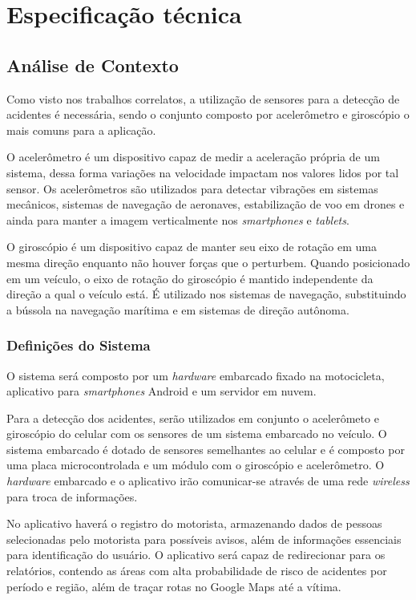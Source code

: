 \chapter{Especificação técnica} \label{cap:metodologia}


\section{Análise de Contexto}

Como visto nos trabalhos correlatos, a utilização de sensores para a detecção de acidentes é necessária, sendo o conjunto composto por acelerômetro e giroscópio o mais comuns para a aplicação. 

O acelerômetro é um dispositivo capaz de medir a aceleração própria de um sistema, dessa forma variações na velocidade impactam nos valores lidos por tal sensor. Os acelerômetros são utilizados para detectar vibrações em sistemas mecânicos, sistemas de navegação de aeronaves, estabilização de voo em drones e ainda para manter a imagem verticalmente nos \textit{smartphones} e \textit{tablets}.

O giroscópio é um dispositivo capaz de manter seu eixo de rotação em uma mesma direção enquanto não houver forças que o perturbem. Quando posicionado em um veículo, o eixo de rotação do giroscópio é mantido independente da direção a qual o veículo está. É utilizado nos sistemas de navegação, substituindo a bússola na navegação marítima e em sistemas de direção autônoma.


\subsection{\textbf{Definições do Sistema}}

O sistema será composto por um \textit{hardware} embarcado fixado na motocicleta, aplicativo para \textit{smartphones} Android e um servidor em nuvem.

Para a detecção dos acidentes, serão utilizados em conjunto o acelerômeto e giroscópio do celular com os sensores de um sistema embarcado no veículo. O sistema embarcado é dotado de sensores semelhantes ao celular e é composto por uma placa microcontrolada e um módulo com o giroscópio e acelerômetro. O \textit{hardware} embarcado e o aplicativo irão comunicar-se através de uma rede \textit{wireless} para troca de informações.

No aplicativo haverá o registro do motorista, armazenando dados de pessoas selecionadas pelo motorista para possíveis avisos, além de informações essenciais para identificação do usuário. O aplicativo será capaz de redirecionar para os relatórios, contendo as áreas com alta probabilidade de risco de acidentes por período e região, além de traçar rotas no Google Maps até a vítima.

